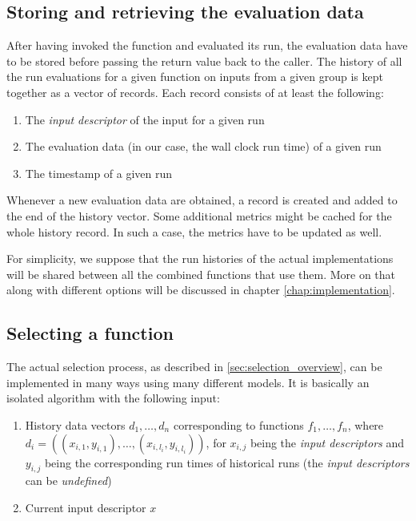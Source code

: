 \subsection{Storing and retrieving the evaluation data}
\label{subsec:storing_evaluation_data}

After having invoked the function and evaluated its run, the evaluation data have to be stored before passing the return value back to the caller. The history of all the run evaluations for a given function on inputs from a given group is kept together as a vector of records. Each record consists of at least the following:

\begin{enumerate}
	\item The \textit{input descriptor} of the input for a given run
	\item The evaluation data (in our case, the wall clock run time) of a given run
	\item The timestamp of a given run
\end{enumerate}

Whenever a new evaluation data are obtained, a record is created and added to the end of the history vector. Some additional metrics might be cached for the whole history record. In such a case, the metrics have to be updated as well.

For simplicity, we suppose that the run histories of the actual implementations will be shared between all the combined functions that use them. More on that along with different options will be discussed in chapter \ref{chap:implementation}.

\subsection{Selecting a function}
\label{subsec:selecting_function}

The actual selection process, as described in \ref{sec:selection_overview}, can be implemented in many ways using many different models. It is basically an isolated algorithm with the following input:
\begin{enumerate}
	\item History data vectors $d_1,\dots,d_n$ corresponding to functions $f_1,\dots,f_n$, where $d_i = ((x_{i,1}, y_{i,1}),\dots,(x_{i,l_i}, y_{i,l_i}))$, for $x_{i,j}$ being the \textit{input descriptors} and $y_{i,j}$ being the corresponding run times of historical runs (the \textit{input descriptors} can be \textit{undefined})
	\item Current input descriptor $x$
\end{enumerate}


